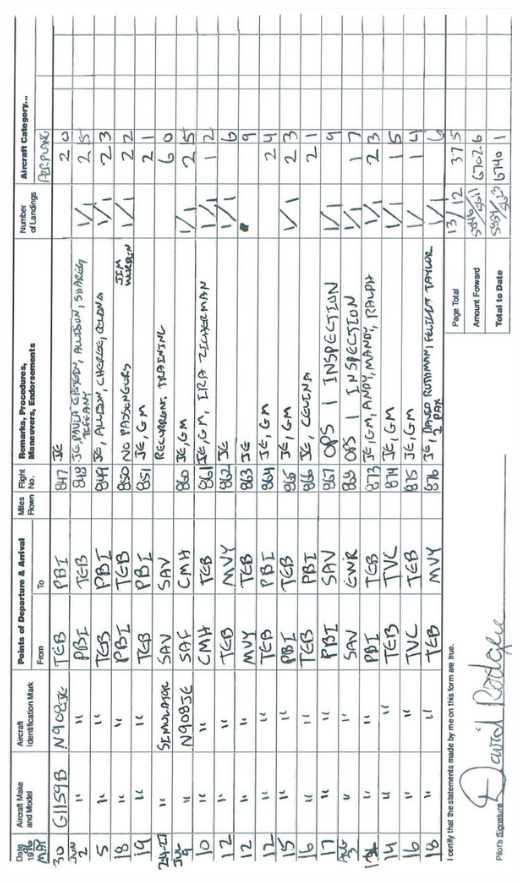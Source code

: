 \documentclass[10pt]{article}
\begin{document}
\includegraphics[max width=\textwidth, center]{2025_02_27_dd68c3d38de88f0516d9g-046}\\
\end{document}
